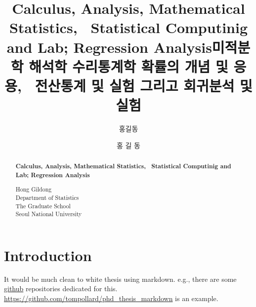 \documentclass[oneside,phd,]{snuthesis}
\title{Calculus, Analysis, Mathematical Statistics, ~Statistical Computinig and
Lab; Regression Analysis}
\title*{미적분학 해석학 수리통계학 확률의 개념 및 응용, ~전산통계 및 실험 그리고
회귀분석 및 실험}
\author{홍길동}
\author*{홍 길 동} %
\begin{document}
\makefrontcover
\makefrontcover
\makeapproval

\cleardoublepage
{}

\begin{abstract}

\begin{center}
\fontsize{22pt}{20pt} \selectfont
\textbf{
Calculus, Analysis, Mathematical Statistics, ~Statistical Computinig and
Lab; Regression Analysis}
\end{center}
\vspace{0.5cm}
\begin{flushright}
\fontsize{14pt}{12pt} \selectfont
Hong Gildong \\
Department of Statistics \\
The Graduate School \\
Seoul National University
\end{flushright}
\vspace{0.5cm}

\noindent

\end{abstract}

\tableofcontents
\listoffigures
\listoftables

\cleardoublepage
{}

%
%

\chapter{Introduction}\label{introduction}

It would be much clean to white thesis using markdown. e.g., there are
some \href{https://github.com}{github} repositories dedicated for this.
\url{https://github.com/tompollard/phd_thesis_markdown} is an example.
\end{document}
